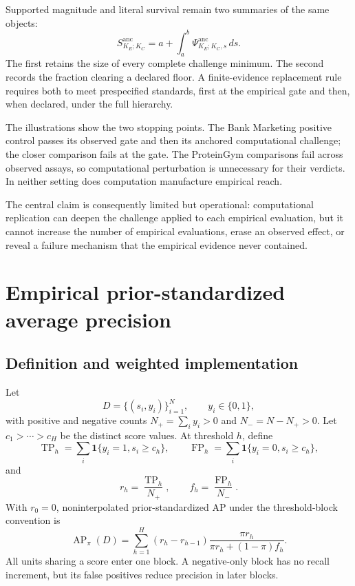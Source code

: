 \documentclass[11pt]{article}
\newcommand{\AP}{\operatorname{AP}}
\newcommand{\Sanc}{S^{\mathrm{anc}}}
\newcommand{\Psianc}{\Psi^{\mathrm{anc}}}
\theoremstyle{remark}
\begin{document}
Supported magnitude and literal survival remain two summaries of the same
objects:
\[
\Sanc_{K_E;K_C}
=
a+\int_a^b\Psianc_{K_E;K_C,s}\,ds.
\]
The first retains the size of every complete challenge minimum. The second
records the fraction clearing a declared floor. A finite-evidence replacement
rule requires both to meet prespecified standards, first at the empirical gate
and then, when declared, under the full hierarchy.

The illustrations show the two stopping points. The Bank Marketing positive
control passes its observed gate and then its anchored computational challenge;
the closer comparison fails at the gate. The ProteinGym comparisons fail
across observed assays, so computational perturbation is unnecessary for their
verdicts. In neither setting does computation manufacture empirical reach.

The central claim is consequently limited but operational: computational
replication can deepen the challenge applied to each empirical evaluation, but
it cannot increase the number of empirical evaluations, erase an observed
effect, or reveal a failure mechanism that the empirical evidence never
contained.


\appendix

\section{Empirical prior-standardized average precision}
\label{app:ap}

\subsection{Definition and weighted implementation}

Let
\[
D=\{(s_i,y_i)\}_{i=1}^N,
\qquad y_i\in\{0,1\},
\]
with positive and negative counts $N_+=\sum_i y_i>0$ and
$N_-=N-N_+>0$. Let $c_1>\cdots>c_H$ be the distinct score values. At
threshold $h$, define
\[
\operatorname{TP}_h
=\sum_i\mathbf 1\{y_i=1,s_i\geq c_h\},
\qquad
\operatorname{FP}_h
=\sum_i\mathbf 1\{y_i=0,s_i\geq c_h\},
\]
and
\[
r_h=\frac{\operatorname{TP}_h}{N_+},
\qquad
f_h=\frac{\operatorname{FP}_h}{N_-}.
\]
With $r_0=0$, noninterpolated prior-standardized AP under the threshold-block
convention is
\begin{equation}
\AP_\pi(D)
=
\sum_{h=1}^H
(r_h-r_{h-1})
\frac{\pi r_h}{\pi r_h+(1-\pi)f_h}.
\label{eq:empirical-ap}
\end{equation}
All units sharing a score enter one block. A negative-only block has no recall
increment, but its false positives reduce precision in later blocks.
\end{document}
